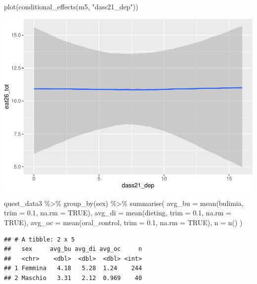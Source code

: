 \documentclass[
]{article}
\newenvironment{Shaded}{\begin{snugshade}}{\end{snugshade}}
\newcommand{\AttributeTok}[1]{\textcolor[rgb]{0.77,0.63,0.00}{#1}}
\newcommand{\ConstantTok}[1]{\textcolor[rgb]{0.00,0.00,0.00}{#1}}
\newcommand{\FloatTok}[1]{\textcolor[rgb]{0.00,0.00,0.81}{#1}}
\newcommand{\FunctionTok}[1]{\textcolor[rgb]{0.00,0.00,0.00}{#1}}
\newcommand{\NormalTok}[1]{#1}
\newcommand{\SpecialCharTok}[1]{\textcolor[rgb]{0.00,0.00,0.00}{#1}}
\newcommand{\StringTok}[1]{\textcolor[rgb]{0.31,0.60,0.02}{#1}}
\begin{document}
\begin{Shaded}
\begin{Highlighting}[]
\FunctionTok{plot}\NormalTok{(}\FunctionTok{conditional\_effects}\NormalTok{(m5, }\StringTok{"dass21\_dep"}\NormalTok{))}
\end{Highlighting}
\end{Shaded}

\includegraphics{050_quest_groups_files/figure-latex/unnamed-chunk-2-9.pdf}

\begin{Shaded}
\begin{Highlighting}[]
\NormalTok{quest\_data3 }\SpecialCharTok{\%\textgreater{}\%} 
  \FunctionTok{group\_by}\NormalTok{(sex) }\SpecialCharTok{\%\textgreater{}\%} 
  \FunctionTok{summarise}\NormalTok{(}
    \AttributeTok{avg\_bu =} \FunctionTok{mean}\NormalTok{(bulimia, }\AttributeTok{trim =} \FloatTok{0.1}\NormalTok{, }\AttributeTok{na.rm =} \ConstantTok{TRUE}\NormalTok{),}
    \AttributeTok{avg\_di =} \FunctionTok{mean}\NormalTok{(dieting, }\AttributeTok{trim =} \FloatTok{0.1}\NormalTok{, }\AttributeTok{na.rm =} \ConstantTok{TRUE}\NormalTok{),}
    \AttributeTok{avg\_oc =} \FunctionTok{mean}\NormalTok{(oral\_control, }\AttributeTok{trim =} \FloatTok{0.1}\NormalTok{, }\AttributeTok{na.rm =} \ConstantTok{TRUE}\NormalTok{),}
    \AttributeTok{n =} \FunctionTok{n}\NormalTok{()}
\NormalTok{  )}
\end{Highlighting}
\end{Shaded}

\begin{verbatim}
## # A tibble: 2 x 5
##   sex     avg_bu avg_di avg_oc     n
##   <chr>    <dbl>  <dbl>  <dbl> <int>
## 1 Femmina   4.18   5.28  1.24    244
## 2 Maschio   3.31   2.12  0.969    40
\end{verbatim}
\end{document}
